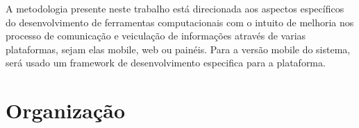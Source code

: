 A metodologia presente neste trabalho está direcionada aos aspectos específicos	do desenvolvimento de ferramentas computacionais com o intuito de melhoria nos processo de comunicação e veiculação de informações através de varias plataformas, sejam elas mobile, web ou painéis. Para a versão mobile do sistema, será usado um framework de desenvolvimento especifica para a plataforma.
	

\section{Organização}
